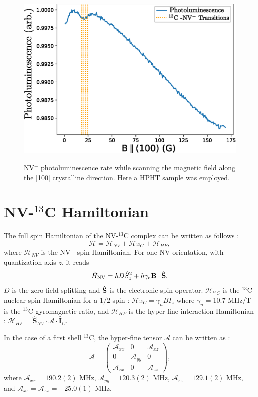 \documentclass[9pt,twocolumn,twoside]{revtex4-1}
\begin{document}
 \begin{figure}[htbp]
\centering
{\includegraphics[width=\linewidth]{sumi4_13C.eps}}
\caption{NV$^-$ photoluminescence rate while scanning the magnetic field along the [100] crystalline direction. Here a HPHT sample was employed.}
\label{fig1SI}
\end{figure}

\section{NV-$^{13}$C Hamiltonian}

The full spin Hamiltonian of the NV-$^{13}$C complex can be written as follows : 
\begin{equation*}
\mathcal{H}=\mathcal{H}_{NV}+\mathcal{H}_{^{13}C}+\mathcal{H}_{HF},
\end{equation*}
where $\mathcal{H}_{NV}$ is the NV$^-$ spin Hamiltonian.
For one NV orientation, with quantization axis $z$, it reads 
\begin{equation}\hat{H}_{\rm NV}=\hbar D \hat{S}_z^2+ \hbar \gamma_e \bf B  \cdot \bf\hat S.
\end{equation}
$D$ is the zero-field-splitting and $\bf\hat S$ is the electronic spin operator.
$\mathcal{H}_{^{13}C}$ is the $^{13}$C nuclear spin Hamiltonian for a $1/2$ spin : $\mathcal{H}_{^{13}C}=\gamma_{n} B I_z$ where $\gamma_{n}=$10.7 MHz/T is the $^{13}$C gyromagnetic ratio, and $\mathcal{H}_{HF}$ is the hyper-fine interaction Hamiltonian : $\mathcal{H}_{HF}= \hat{\mathbf{S}}_{NV} \cdot \mathcal{A} \cdot \hat{\mathbf{I}}_C$.

In the case of a first shell $^{13}$C, the hyper-fine tensor $\mathcal{A}$ can be written as \citep{simanovskaia_sidebands_2013} : $$ \mathcal{A} = \begin{pmatrix}
\mathcal{A}_{xx} & 0 & \mathcal{A}_{xz} \\ 0 & \mathcal{A}_{yy} & 0 \\ \mathcal{A}_{zx} & 0 & \mathcal{A}_{zz}
\end{pmatrix},$$
where $\mathcal{A}_{xx}=190.2(2)$ MHz, $\mathcal{A}_{yy}=120.3(2)$ MHz, $\mathcal{A}_{zz}=129.1(2)$ MHz, and  $\mathcal{A}_{xz}=\mathcal{A}_{zx}=-25.0(1)$ MHz. 
\end{document}
